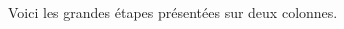 Voici les grandes étapes présentées sur deux colonnes.


\begin{multicols}{2}


\emptybox\emptybox%
\emptybox\emptybox

\phantom{\emptybox\emptybox}%
	\head


\medskip %
\emptybox\emptybox%
\emptybox\emptybox

\phantom{\emptybox\emptybox%
	\emptybox\emptybox\emptybox\emptybox}%
	\head


\medskip %
\emptybox\emptybox%
\emptybox\emptybox

\phantom{\emptybox\emptybox%
	\emptybox\emptybox\emptybox\emptybox}%
	\head


\medskip %
\emptybox\emptybox%
	\emptybox{}\emptybox%
\emptybox\emptybox

\phantom{\emptybox\emptybox%
	\emptybox}%
	\head

\vfill\null
\columnbreak

\medskip %
\emptybox\emptybox%
	\emptybox{}\emptybox%
\emptybox\emptybox

\phantom{\emptybox\emptybox%
	\emptybox}%
	\head


\medskip %
\emptybox\emptybox%
	\emptybox{}\emptybox%
\emptybox\emptybox

\phantom{\emptybox\emptybox%
	\emptybox\emptybox\emptybox}%
	\head


\medskip %
\emptybox\emptybox%
	\emptybox{}\emptybox%
\emptybox\emptybox

\phantom{\emptybox\emptybox%
	\emptybox\emptybox\emptybox}%
	\head

\end{multicols}


\vspace{-1em}

